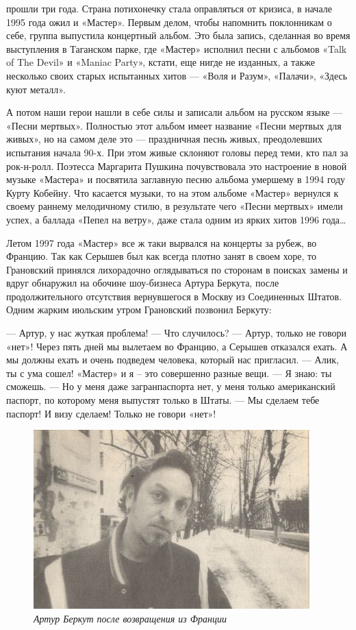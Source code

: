 \documentclass[16pt,a5paper,oneside]{book}
\begin{document}
 прошли три года. Страна потихонечку стала оправляться от кризиса, в начале 1995 года ожил и «Мастер». Первым
делом, чтобы напомнить поклонникам о себе, группа выпустила концертный альбом. Это была запись, сделанная во время
выступления в Таганском парке, где «Мастер» исполнил песни с альбомов «Talk of The Devil» и «Maniac Party», кстати, еще
нигде не изданных, а также несколько своих старых испытанных хитов — «Воля и Разум», «Палачи», «Здесь куют металл».

А потом наши герои нашли в себе силы и записали альбом на русском языке — «Песни мертвых». Полностью этот альбом имеет
название «Песни мертвых для живых», но на самом деле это — праздничная песнь живых, преодолевших испытания начала 90-х.
При этом живые склоняют головы перед теми, кто пал за рок-н-ролл. Поэтесса Маргарита Пушкина почувствовала это
настроение в новой музыке «Мастера» и посвятила заглавную песню альбома умершему в 1994 году Курту Кобейну. Что касается
музыки, то на этом альбоме «Мастер» вернулся к своему раннему мелодичному стилю, в результате чего «Песни мертвых» имели
успех, а баллада «Пепел на ветру», даже стала одним из ярких хитов 1996 года\ldots

Летом 1997 года «Мастер» все ж таки вырвался на концерты за рубеж, во Францию. Так как Серышев был как всегда плотно
занят в своем хоре, то Грановский принялся лихорадочно оглядываться по сторонам в поисках замены и вдруг обнаружил на
обочине шоу-бизнеса Артура Беркута, после продолжительного отсутствия вернувшегося в Москву из Соединенных Штатов. Одним
жарким июльским утром Грановский позвонил Беркуту:

— Артур, у нас жуткая проблема!
— Что случилось?
— Артур, только не говори «нет»! Через пять дней мы вылетаем во Францию, а Серышев отказался ехать. А мы должны ехать и
очень подведем человека, который нас пригласил.
— Алик, ты с ума сошел! «Мастер» и я – это совершенно разные вещи.
— Я знаю: ты сможешь.
— Но у меня даже загранпаспорта нет, у меня только американский паспорт, по которому меня выпустят только в Штаты.
— Мы сделаем тебе паспорт! И визу сделаем! Только не говори «нет»!

\begin{figure}
    \centering
    \includegraphics[scale=0.8]{Image30}
    \caption{\textit{Артур Беркут после возвращения из Франции}}
\end{figure}
\end{document}
